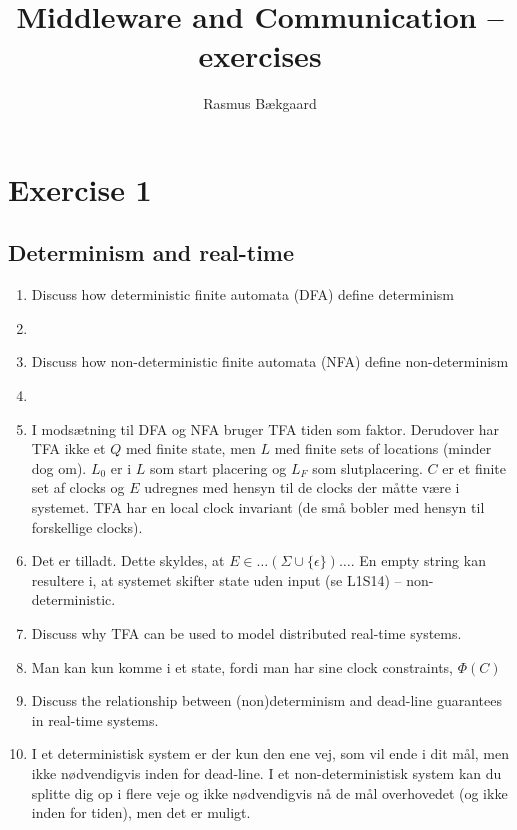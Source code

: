 \documentclass[oneside, 10pt]{article}
\title{Middleware and Communication -- exercises}
\author{Rasmus Bækgaard}
\date{}
\begin{document}
\maketitle


\section{Exercise 1}
\subsection{Determinism and real-time}
\begin{enumerate}
	\item Discuss how deterministic finite automata (DFA) define determinism
	\item[] 
	
	\item Discuss how non-deterministic finite automata (NFA) define non-determinism
	\item[]

	\item I modsætning til DFA og NFA bruger TFA tiden som faktor.
	Derudover har TFA ikke et $Q$ med finite state, men $L$ med finite sets of locations (minder dog om). 
	$L_0$ er i $L$ som start placering og $L_F$ som slutplacering.
	$C$ er et finite set af clocks og $E$ udregnes med hensyn til de clocks der måtte være i systemet.
	TFA har en local clock invariant (de små bobler med hensyn til forskellige clocks).

	\item Det er tilladt. Dette skyldes, at $E \in \ldots ( \Sigma \cup \{ \epsilon \}) \ldots$. En empty string kan resultere i, at systemet skifter state uden input (se L1S14) -- non-deterministic.

	\item  Discuss why TFA can be used to model distributed real-time systems.
	\item[] Man kan kun komme i et state, fordi man har sine clock constraints, $\Phi(C)$

	\item  Discuss the relationship between (non)determinism and dead-line guarantees in real-time systems.
	\item[] I et deterministisk system er der kun den ene vej, som vil ende i dit mål, men ikke nødvendigvis inden for dead-line. 
	I et non-deterministisk system kan du splitte dig op i flere veje og ikke nødvendigvis nå de mål overhovedet (og ikke inden for tiden), men det er muligt.



\end{enumerate}
\end{document}
